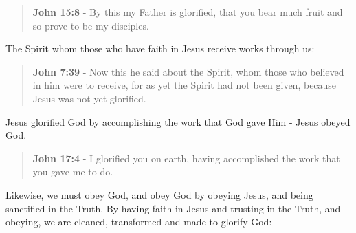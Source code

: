 \documentclass[11pt]{article}
\begin{document}
\begin{quote}
\textbf{John 15:8} - By this my Father is glorified, that you bear much fruit and so prove to be my disciples.
\end{quote}

The Spirit whom those who have faith in Jesus receive works through us:

\begin{quote}
\textbf{John 7:39} - Now this he said about the Spirit, whom those who believed in him were to receive, for as yet the Spirit had not been given, because Jesus was not yet glorified.
\end{quote}

Jesus glorified God by accomplishing the work that God gave Him - Jesus obeyed God.

\begin{quote}
\textbf{John 17:4} - I glorified you on earth, having accomplished the work that you gave me to do.
\end{quote}

Likewise, we must obey God, and obey God by obeying Jesus, and being sanctified in the Truth. By having faith in Jesus and trusting in the Truth, and obeying, we are cleaned, transformed and made to glorify God:
\end{document}
